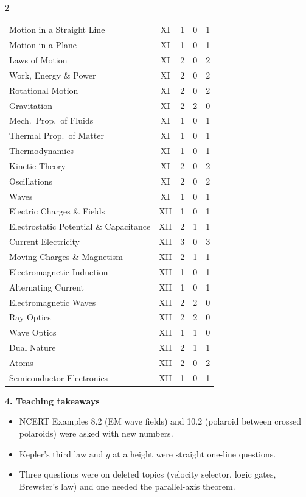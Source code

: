 \begin{multicols}{2}
{\begin{tabular}{@{}p{4.7cm}c@{\,}r@{\,}r@{\,}r@{}}
Motion in a Straight Line & XI & 1 & 0 & 1\\
Motion in a Plane & XI & 1 & 0 & 1\\
Laws of Motion & XI & 2 & 0 & 2\\
Work, Energy \& Power & XI & 2 & 0 & 2\\
Rotational Motion & XI & 2 & 0 & 2\\
Gravitation & XI & 2 & 2 & 0\\
Mech.\ Prop.\ of Fluids & XI & 1 & 0 & 1\\
Thermal Prop.\ of Matter & XI & 1 & 0 & 1\\
Thermodynamics & XI & 1 & 0 & 1\\
Kinetic Theory & XI & 2 & 0 & 2\\
Oscillations & XI & 2 & 0 & 2\\
Waves & XI & 1 & 0 & 1\\
Electric Charges \& Fields & XII & 1 & 0 & 1\\
Electrostatic Potential \& Capacitance & XII & 2 & 1 & 1\\
Current Electricity & XII & 3 & 0 & 3\\
Moving Charges \& Magnetism & XII & 2 & 1 & 1\\
Electromagnetic Induction & XII & 1 & 0 & 1\\
Alternating Current & XII & 1 & 0 & 1\\
Electromagnetic Waves & XII & 2 & 2 & 0\\
Ray Optics & XII & 2 & 2 & 0\\
Wave Optics & XII & 1 & 1 & 0\\
Dual Nature & XII & 2 & 1 & 1\\
Atoms & XII & 2 & 0 & 2\\
Semiconductor Electronics & XII & 1 & 0 & 1\\
\bottomrule\end{tabular}}\par\medskip
\textbf{\color{crimson}4. Teaching takeaways}\par\smallskip
{\footnotesize\begin{itemize}[leftmargin=1em,nosep]
\item NCERT Examples 8.2 (EM wave fields) and 10.2 (polaroid between crossed polaroids) were asked with new numbers.
\item Kepler's third law and $g$ at a height were straight one-line questions.
\item Three questions were on deleted topics (velocity selector, logic gates, Brewster's law) and one needed the parallel-axis theorem.

\end{itemize}}
\end{multicols}
